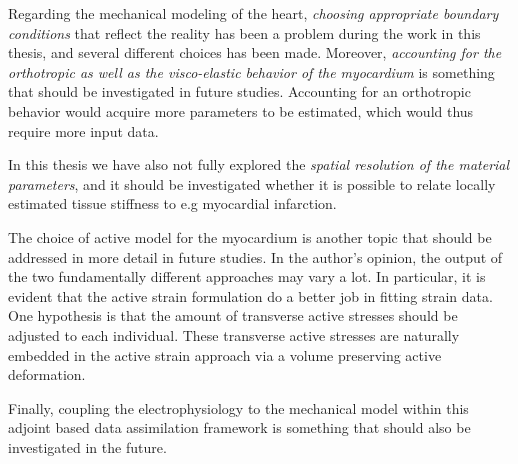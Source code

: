 Regarding the mechanical modeling of the heart, 
\emph{choosing appropriate boundary conditions} that reflect the reality has
been a problem during the work in this thesis, and several different
choices has been made. Moreover, \emph{accounting for the orthotropic as
well as the visco-elastic behavior of the myocardium} is something that should
be investigated in future studies. Accounting for an orthotropic
behavior would acquire more parameters to be estimated, which would
thus require more input data.

In this thesis we have also not fully
explored the \emph{spatial resolution of the material parameters}, and it
should be investigated whether it is possible to relate locally estimated
tissue stiffness to e.g myocardial infarction.

The choice of active model for the myocardium is another topic that
should be addressed in more detail in future studies. In the author's
opinion, the output of the two fundamentally different approaches may
vary a lot. In particular, it is evident that the active strain
formulation do a better job in fitting strain data. One
hypothesis is that the amount of transverse active stresses should be
adjusted to each individual. These transverse active stresses are
naturally embedded in the active strain approach via a volume
preserving active deformation. 

Finally, coupling the electrophysiology to the mechanical model within
this adjoint based data assimilation framework is something that
should also be investigated in the future. 





